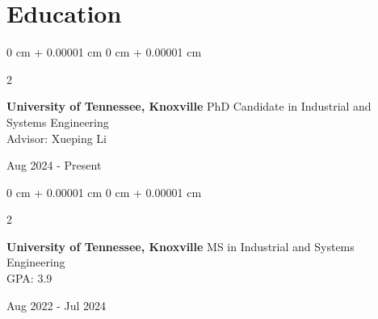 \documentclass[10pt, letterpaper]{article}
\newenvironment{highlightsforbulletentries}{
    \begin{itemize}[
        topsep=0.10 cm,
        parsep=0.10 cm,
        partopsep=0pt,
        itemsep=0pt,
        leftmargin=10pt
    ]
}{
    \end{itemize}
} %
\newenvironment{onecolentry}{
    \begin{adjustwidth}{
        0 cm + 0.00001 cm
    }{
        0 cm + 0.00001 cm
    }
}{
    \end{adjustwidth}
} %
\newenvironment{twocolentry}[2][]{
    \onecolentry
    \def\secondColumn{#2}
    \setcolumnwidth{\fill, 4.5 cm}
    \begin{paracol}{2}
}{
    \switchcolumn \raggedleft \secondColumn
    \end{paracol}
    \endonecolentry
} %
\begin{document}



    










\section*{Education}
\begin{twocolentry}{Aug 2024 - Present}
    \small \textbf{University of Tennessee, Knoxville} \textbar PhD Candidate in Industrial and Systems Engineering \\
    Advisor: Xueping Li
\end{twocolentry}

\begin{twocolentry}{Aug 2022 - Jul 2024}
    \small \textbf{University of Tennessee, Knoxville} \textbar MS in Industrial and Systems Engineering\\
    GPA: 3.9
\end{twocolentry}
\end{document}
